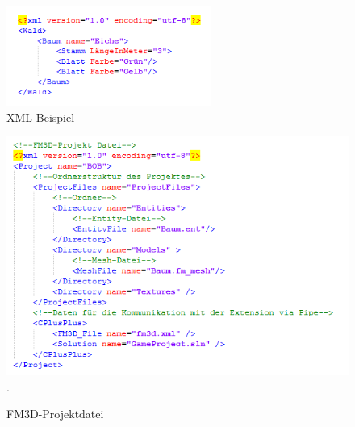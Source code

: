 \begin{figure}
	\begin{center}
		\includegraphics[width=0.6\textwidth]{03unserprogramm/Designer/xmlbsp.png}
		\caption{XML-Beispiel}\label{xmlbsp}
	\end{center}
\end{figure}
\begin{figure}
	\begin{center}
		\includegraphics[width=\textwidth]{03unserprogramm/Designer/FM3DProjektdatei.PNG}.
		\caption{FM3D-Projektdatei}\label{fm3dprojekt}
	\end{center}
\end{figure}
%
